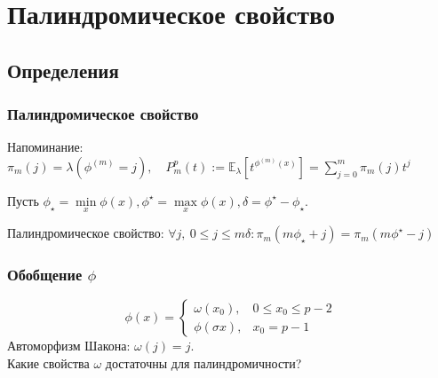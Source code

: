 \section{Палиндромическое свойство}
\subsection{Определения}
\begin{frame}
    \frametitle{Палиндромическое свойство}
    Напоминание: $\pi_m(j) = \lambda(\phi^{(m)}=j),\quad P_m^p(t):= \mathbb{E}_\lambda\left[ t^{\phi^{(m)}(x)}\right] = \sum\limits_{j=0}^m \pi_m(j) t^j$
    
    Пусть $\phi_\star = \min\limits_x \phi(x), \phi^\star = \max\limits_x \phi(x), \delta=\phi^\star - \phi_\star$.
    
     Палиндромическое свойство: $\forall j,\ 0 \le j \le m\delta:   \pi_m(m\phi_\star + j)=\pi_m(m\phi^\star-j)$
\end{frame}

\begin{frame}
    \frametitle{Обобщение $\phi$}

    $$
    \phi(x) = \begin{cases}
                    \omega(x_0), & 0 \le x_0 \le p - 2 \\
                    \phi(\sigma x), & x_0 = p - 1
                \end{cases}
    $$
    Автоморфизм Шакона: $\omega(j)=j$.\\

    Какие свойства $\omega$ достаточны для палиндромичности?
\end{frame}

